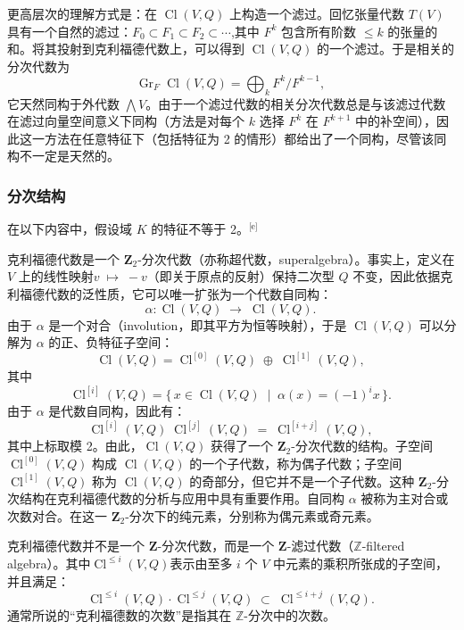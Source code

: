更高层次的理解方式是：在 $\operatorname{Cl}(V, Q)$ 上构造一个滤过。回忆张量代数 $T(V)$ 具有一个自然的滤过：$F_0 \subset F_1 \subset F_2 \subset \cdots$,其中 $F^k$ 包含所有阶数 $\leq k$ 的张量的和。将其投射到克利福德代数上，可以得到 $\operatorname{Cl}(V, Q)$ 的一个滤过。于是相关的分次代数为
$$
\operatorname{Gr}_F \operatorname{Cl}(V, Q) = \bigoplus_k F^k / F^{k-1},~
$$
它天然同构于外代数 $\bigwedge V$。由于一个滤过代数的相关分次代数总是与该滤过代数在滤过向量空间意义下同构（方法是对每个 $k$ 选择 $F^k$ 在 $F^{k+1}$ 中的补空间），因此这一方法在任意特征下（包括特征为 2 的情形）都给出了一个同构，尽管该同构不一定是天然的。
\subsubsection{分次结构}
在以下内容中，假设域 $K$ 的特征不等于 2。\(^\text{[e]}\)

克利福德代数是一个 $\mathbf{Z}_2$-分次代数（亦称超代数，superalgebra）。事实上，定义在 $V$ 上的线性映射$v \;\mapsto\; -v$（即关于原点的反射）保持二次型 $Q$ 不变，因此依据克利福德代数的泛性质，它可以唯一扩张为一个代数自同构：
$$
\alpha : \operatorname{Cl}(V, Q) \;\longrightarrow\; \operatorname{Cl}(V, Q).~
$$
由于 $\alpha$ 是一个对合（involution，即其平方为恒等映射），于是 $\operatorname{Cl}(V, Q)$ 可以分解为 $\alpha$ 的正、负特征子空间：
$$
\operatorname{Cl}(V, Q) = \operatorname{Cl}^{[0]}(V, Q) \;\oplus\; \operatorname{Cl}^{[1]}(V, Q),~
$$
其中
$$
\operatorname{Cl}^{[i]}(V, Q) = \{\, x \in \operatorname{Cl}(V, Q) \;\mid\; \alpha(x) = (-1)^i x \,\}.~
$$
由于 $\alpha$ 是代数自同构，因此有：
$$
\operatorname{Cl}^{[i]}(V, Q)\; \operatorname{Cl}^{[j]}(V, Q) \;=\; \operatorname{Cl}^{[i+j]}(V, Q),~
$$
其中上标取模 2。由此，$\operatorname{Cl}(V, Q)$ 获得了一个 $\mathbf{Z}_2$-分次代数的结构。子空间 $\operatorname{Cl}^{[0]}(V, Q)$ 构成 $\operatorname{Cl}(V, Q)$ 的一个子代数，称为偶子代数；子空间 $\operatorname{Cl}^{[1]}(V, Q)$ 称为 $\operatorname{Cl}(V, Q)$ 的奇部分，但它并不是一个子代数。这种 $\mathbf{Z}_2$-分次结构在克利福德代数的分析与应用中具有重要作用。自同构 $\alpha$ 被称为主对合或次数对合。在这一 $\mathbf{Z}_2$-分次下的纯元素，分别称为偶元素或奇元素。

克利福德代数并不是一个 $\mathbf{Z}$-分次代数，而是一个 $\mathbf{Z}$-滤过代数（$\mathbb{Z}$-filtered algebra）。其中$\operatorname{Cl}^{\leqslant i}(V, Q)$表示由至多 $i$ 个 $V$ 中元素的乘积所张成的子空间，并且满足：
$$
\operatorname{Cl}^{\leqslant i}(V, Q) \cdot \operatorname{Cl}^{\leqslant j}(V, Q) \;\subset\; \operatorname{Cl}^{\leqslant i+j}(V, Q).~
$$
通常所说的“克利福德数的次数”是指其在 $\mathbb{Z}$-分次中的次数。


